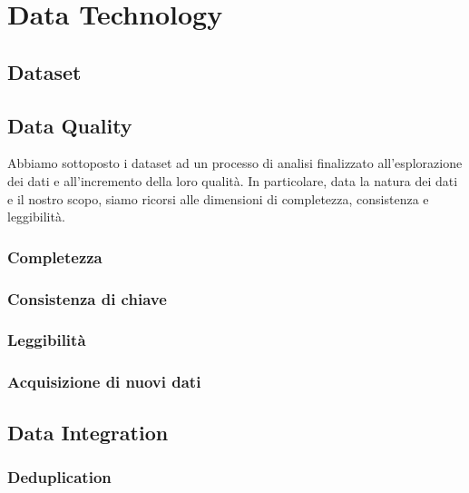 \setcounter{chapter}{0}

\part{Data Technology}

\chapter{Dataset}

\chapter{Data Quality}
\label{chap:data-quality}
Abbiamo sottoposto i dataset ad un processo di analisi finalizzato 
all'esplorazione dei dati e all'incremento della loro qualità. In particolare, 
data la natura dei dati e il nostro scopo, siamo ricorsi alle dimensioni di 
completezza, consistenza e leggibilità.


\section{Completezza}

\section{Consistenza di chiave}

\section{Leggibilità}

\section{Acquisizione di nuovi dati}

\chapter{Data Integration}
\label{chap:data-integration}

\section{Deduplication}

